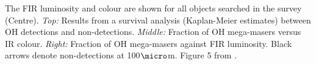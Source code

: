 \label{fig:oh_props} The FIR luminosity and colour are shown for all objects searched in the \citet{darling2002_paperIII} survey (Centre). {\it Top:} Results from a survival analysis (Kaplan-Meier estimates) between OH detections and non-detections. {\it Middle:} Fraction of OH mega-masers versus IR colour. {\it Right:} Fraction of OH mega-masers against FIR luminosity. Black arrows denote non-detections at 100$\micro$m. Figure 5 from \citet{darling2002_paperIII}. 